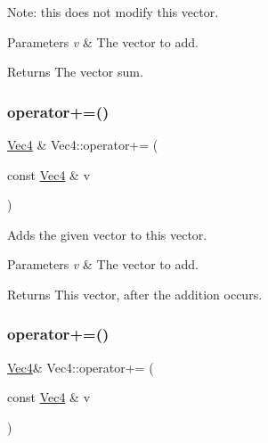 Note\+: this does not modify this vector.


\begin{DoxyParams}{Parameters}
{\em v} & The vector to add. \\
\hline
\end{DoxyParams}
\begin{DoxyReturn}{Returns}
The vector sum. 
\end{DoxyReturn}
\mbox{\label{classVec4_a95b688b8dddd65d5a775c56755ed050f}} 
\subsubsection{\texorpdfstring{operator+=()}{operator+=()}\hspace{0.1cm}{\footnotesize\ttfamily [1/2]}}
{\footnotesize\ttfamily \hyperlink{classVec4}{Vec4} \& Vec4\+::operator+= (\begin{DoxyParamCaption}\item[{const \hyperlink{classVec4}{Vec4} \&}]{v }\end{DoxyParamCaption})\hspace{0.3cm}{\ttfamily [inline]}}

Adds the given vector to this vector.


\begin{DoxyParams}{Parameters}
{\em v} & The vector to add. \\
\hline
\end{DoxyParams}
\begin{DoxyReturn}{Returns}
This vector, after the addition occurs. 
\end{DoxyReturn}
\mbox{\label{classVec4_adcf05f3b2dddca53b2fe4d1825e1a263}} 
\subsubsection{\texorpdfstring{operator+=()}{operator+=()}\hspace{0.1cm}{\footnotesize\ttfamily [2/2]}}
{\footnotesize\ttfamily \hyperlink{classVec4}{Vec4}\& Vec4\+::operator+= (\begin{DoxyParamCaption}\item[{const \hyperlink{classVec4}{Vec4} \&}]{v }\end{DoxyParamCaption})\hspace{0.3cm}{\ttfamily [inline]}}

